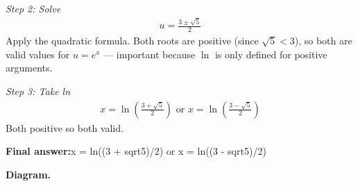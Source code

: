 \documentclass[11pt]{article}
\begin{document}
\textit{Step 2: Solve}
\[\begin{gathered}
u = \frac{3 \pm \sqrt{5}}{2}
\end{gathered}\]
Apply the quadratic formula. Both roots are positive (since \( \sqrt{5} < 3 \)), so both are valid values for \( u = e^x \) --- important because \( \ln \) is only defined for positive arguments.

\textit{Step 3: Take ln}
\[\begin{gathered}
x = \ln\left(\frac{3 + \sqrt{5}}{2}\right) \text{ or } x = \ln\left(\frac{3 - \sqrt{5}}{2}\right)
\end{gathered}\]
Both positive so both valid.

\begin{answerbox}
\textbf{Final answer:}\quad x = ln((3 + sqrt5)/2) or x = ln((3 - sqrt5)/2)
\end{answerbox}
\textbf{Diagram.}
\end{document}
